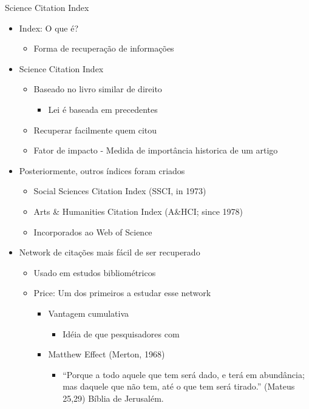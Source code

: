 \documentclass[bigger]{beamer}
\begin{document}
\begin{frame}[label={sec:orgb94e452}]{Science Citation Index}
\begin{itemize}
\item Index: O que é?
\begin{itemize}
\item Forma de recuperação de informações
\end{itemize}

\item Science Citation Index \parencite{garfield1955}
\begin{itemize}
\item Baseado no livro similar de direito
\begin{itemize}
\item Lei é baseada em precedentes
\end{itemize}
\item Recuperar facilmente quem citou
\item Fator de impacto - Medida de importância historica de um artigo
\end{itemize}

\item Posteriormente, outros índices foram criados
\begin{itemize}
\item Social Sciences Citation Index (SSCI, in 1973)
\item Arts \& Humanities Citation Index (A\&HCI; since 1978)
\item Incorporados ao Web of Science
\end{itemize}

\item Network de citações mais fácil de ser recuperado
\begin{itemize}
\item Usado em estudos bibliométricos
\item Price: Um dos primeiros a estudar esse network
\begin{itemize}
\item Vantagem cumulativa
\begin{itemize}
\item Idéia de que pesquisadores com \parencite{mattedi2017}
\end{itemize}
\item Matthew Effect (Merton, 1968)
\begin{itemize}
\item ``Porque a todo aquele que tem será dado, e terá em abundância; mas daquele que não tem, até o que tem será tirado.'' (Mateus 25,29) Bíblia de Jerusalém.
\end{itemize}
\end{itemize}
\end{itemize}
\end{itemize}
\end{frame}
\end{document}
